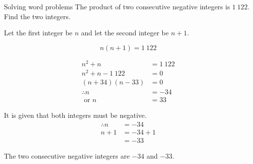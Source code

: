 \begin{wex}
{Solving word problems}
{The product of two consecutive negative integers is $1~122$. Find the two integers.}
{
Let the first integer be $n$ and let the second integer be $n+1$. 

\begin{equation*}
  n(n+1) = 1~122
\end{equation*}

\begin{align*}
  n^{2} + n &= 1~122 \\
  n^{2} + n - 1~122 &= 0 \\
  (n+34)(n-33) &= 0 \\
  \therefore  n &= -34 \\
  \mbox{ or } n &= 33
\end{align*}

It is given that both integers must be negative.
\begin{align*}
  \therefore n &= -34 \\
  n + 1 &= -34 + 1 \\
  &= -33
\end{align*}

The two consecutive negative integers are $-34$ and $-33$.
}
\end{wex}

